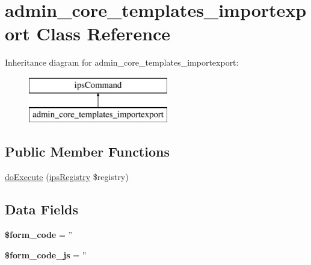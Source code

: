 \hypertarget{classadmin__core__templates__importexport}{\section{admin\-\_\-core\-\_\-templates\-\_\-importexport Class Reference}
\label{classadmin__core__templates__importexport}
}
Inheritance diagram for admin\-\_\-core\-\_\-templates\-\_\-importexport\-:\begin{figure}[H]
\begin{center}
\leavevmode
\includegraphics[height=2.000000cm]{classadmin__core__templates__importexport}
\end{center}
\end{figure}
\subsection*{Public Member Functions}
\begin{DoxyCompactItemize}
\item 
\hyperlink{classadmin__core__templates__importexport_afbc4e912a0604b94d47d66744c64d8ba}{do\-Execute} (\hyperlink{classips_registry}{ips\-Registry} \$registry)
\end{DoxyCompactItemize}
\subsection*{Data Fields}
\begin{DoxyCompactItemize}
\item 
\hypertarget{classadmin__core__templates__importexport_af28aee726fa3eb6c355d08a2ab655e03}{{\bfseries \$form\-\_\-code} = ''}\label{classadmin__core__templates__importexport_af28aee726fa3eb6c355d08a2ab655e03}

\item 
\hypertarget{classadmin__core__templates__importexport_ac68fe8a02a2efd63c3271179f4b4fbb7}{{\bfseries \$form\-\_\-code\-\_\-js} = ''}\label{classadmin__core__templates__importexport_ac68fe8a02a2efd63c3271179f4b4fbb7}

\end{DoxyCompactItemize}
